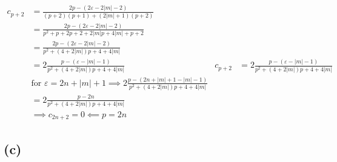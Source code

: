 \documentclass[letter, 10pts]{article}
\begin{document}
\begin{align*}
	c_{p+2}
	&= 
	\frac{
 2 p  - (2 \varepsilon - 2 |m| - 2) 
	}
	{(p+2)(p+1)  + (2|m|+1) (p+2)} \\ 
&=  \frac{
	2p - (2 \varepsilon - 2 |m| - 2)  
}{p^2 + p + 2p + 2 + 2 |m| p + 4 |m|+ p + 2}
	\\
&=  \frac{
	2p - (2 \varepsilon - 2 |m| - 2)  
}{p^2 + (4 + 2 |m| )p + 4 + 4 |m|}
	\\
&=  2\frac{
	p - ( \varepsilon -  |m| - 1)  
}{p^2 + (4 + 2 |m| )p + 4 + 4 |m|}
&
c_{p+2}
&=  2\frac{
	p - ( \varepsilon -  |m| - 1)  
}{p^2 + (4 + 2 |m| )p + 4 + 4 |m|}
	\\
&\text{for $\varepsilon = 2n +|m| +1$}\implies  2\frac{
	p - ( 2n +|m| +1  -  |m| - 1)  
}{p^2 + (4 + 2 |m| )p + 4 + 4 |m|}
	\\
&= 2\frac{
	p - 2n
}{p^2 + (4 + 2 |m| )p + 4 + 4 |m|}
	\\
&\implies c_{2n + 2} = 0 \impliedby p = 2n
\end{align*}




\subsection*{(c)}
\end{document}
